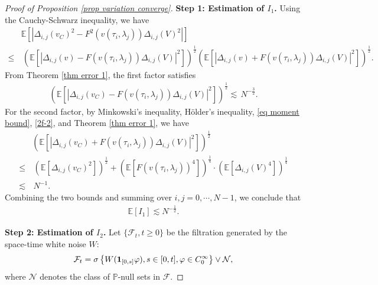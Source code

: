 \documentclass[11pt,reqno]{amsart}
\numberwithin{equation}{section}
\newcommand{\1}{{\bf 1}}
\newcommand{\2}{{\bf 2}}
\begin{document}
\begin{proof}[Proof of Proposition \ref{prop variation converge}]
\noindent\textbf{Step 1:  Estimation of  $I_1$.}
  Using  the Cauchy-Schwarz inequality,     we have
 \begin{align*} 
&\mathbb E \left[\left|\Delta_{i,j}(v_C)^2 - F^2(v(\tau_i, \lambda_j)) \Delta_{i,j}(V)^2\right| \right]\\
\le &\,   \left( \mathbb E \left[\left|\Delta_{i,j}(v)-   F (v(\tau_i, \lambda_j)) \Delta_{i,j}(V)\right|^2 \right]\right)^{\frac12} \left( \mathbb E \left[\left|\Delta_{i,j}(v)+   F (v(\tau_i, \lambda_j)) \Delta_{i,j}(V)\right|^2 \right]\right)^{\frac12} .
 \end{align*}
 From Theorem \ref{thm error 1},  the first factor satisfies 
  \begin{align*}
  \left( \mathbb E \left[\left|\Delta_{i,j}(v_C)-   F (v(\tau_i, \lambda_j)) \Delta_{i,j}(V)\right|^2 \right]\right)^{\frac12} 
 \lesssim  \,   N^{-\frac{3}{2}}.
 \end{align*}
  For the second factor,    by  Minkowski's inequality,  H\"older's inequality,  \eqref{eq moment bound}, \eqref{2f-2},  and  Theorem \ref{thm error 1}, we have 
  \begin{align*}
&  \left( \mathbb E \left[\left|\Delta_{i,j}(v_C)+   F (v(\tau_i, \lambda_j)) \Delta_{i,j}(V)\right|^2 \right]\right)^{\frac12}\\
  \le &\, \left( \mathbb E \left[\Delta_{i,j}(v_C)^2 \right]\right)^{\frac12}+ \left( \mathbb E \left[  F (v(\tau_i, \lambda_j))^4\right]\right)^{\frac14}\cdot   \left( \mathbb E \left[ \Delta_{i,j}(V)^4 \right]\right)^{\frac14} \\
   \lesssim & \,  N^{-1}.
  \end{align*}
 Combining the two bounds   and summing over  $i, j=0, \cdots, N-1$, we conclude that 
 \begin{align*}
\mathbb E [I_1] \lesssim  N^{-\frac12}.
  \end{align*} 

\noindent\textbf{Step 2:  Estimation of  $I_2$.}
      Let    $\{\mathcal F_t, t\ge0\}$  be the filtration     generated by the space-time white noise $W$:
\begin{align}\label{eq sigma filed}
\mathcal F_t=\sigma\left\{W({\bf 1}_{[0,s]} \varphi), s\in [0, t], \varphi\in  C_0^{\infty}\right\} \vee \mathcal N, 
\end{align}
 where $\mathcal N$ denotes the  class of  $\mathbb P$-null sets in $\mathcal F$. 
      

\end{proof}
\end{document}
